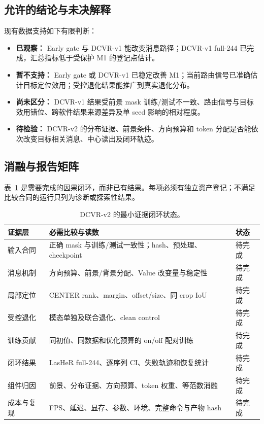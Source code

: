 \documentclass[journal]{IEEEtran}
\begin{document}
\subsection{允许的结论与未决解释}
现有数据支持如下有限判断：
\begin{itemize}
  \item \textbf{已观察：} Early gate 与 DCVR-v1 能改变消息路径；DCVR-v1 full-244 已完成，汇总指标低于受保护 M1 的登记点估计。
  \item \textbf{暂不支持：} Early gate 或 DCVR-v1 已稳定改善 M1；当前路由信号已准确估计目标定位效用；受控退化结果能推广到真实退化分布。
  \item \textbf{尚未区分：} DCVR-v1 结果受前景 mask 训练/测试不一致、路由信号与目标效用错位、跨软件结果来源差异及单 seed 影响的相对程度。
  \item \textbf{待检验：} DCVR-v2 的分布证据、前景条件、方向预算和 token 分配是否能依次改变目标相关消息、中心读出及闭环轨迹。
\end{itemize}

\subsection{消融与报告矩阵}
表~\ref{tab:closure} 是需要完成的因果闭环，而非已有结果。每项必须有独立资产登记；不满足比较合同的运行只列为诊断或探索性结果。
\begin{table}[t]
\centering
\caption{DCVR-v2 的最小证据闭环状态。}
\label{tab:closure}
\small
\begin{tabular}{p{2.1cm}p{4.7cm}p{1.1cm}}
\toprule
证据层 & 必需比较与读数 & 状态\\
\midrule
输入合同 & 正确 mask 与训练/测试一致性；hash、预处理、checkpoint & 待完成\\
消息机制 & 方向预算、前景/背景分配、Value 改变量与稳定性 & 待完成\\
局部定位 & CENTER rank、margin、offset/size、同 crop IoU & 待完成\\
受控退化 & 模态单独及联合退化、clean control & 待完成\\
训练贡献 & 同初值、同数据和优化预算的 on/off 配对训练 & 待完成\\
闭环结果 & LasHeR full-244、逐序列 CI、失败轨迹和恢复统计 & 待完成\\
组件归因 & 前景、分布证据、方向预算、token 权重、等范数消融 & 待完成\\
成本与复现 & FPS、延迟、显存、参数、环境、完整命令与产物 hash & 待完成\\
\bottomrule
\end{tabular}
\end{table}
\end{document}

